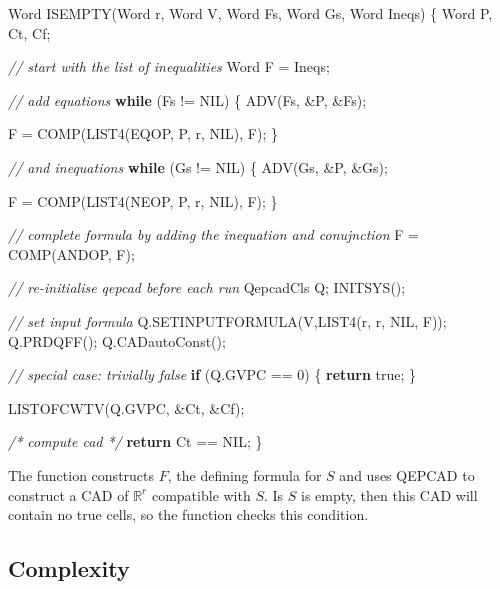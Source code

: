 \documentclass[
]{book}
\newenvironment{Shaded}{\begin{snugshade}}{\end{snugshade}}
\newcommand{\CommentTok}[1]{\textcolor[rgb]{0.56,0.35,0.01}{\textit{#1}}}
\newcommand{\ControlFlowTok}[1]{\textcolor[rgb]{0.13,0.29,0.53}{\textbf{#1}}}
\newcommand{\DecValTok}[1]{\textcolor[rgb]{0.00,0.00,0.81}{#1}}
\newcommand{\NormalTok}[1]{#1}
\theoremstyle{definition}
\theoremstyle{definition}
\theoremstyle{definition}
\theoremstyle{definition}
\theoremstyle{remark}
\begin{document}
\begin{Shaded}
\begin{Highlighting}[numbers=left,,]
\NormalTok{Word ISEMPTY(Word r, Word V, Word Fs, Word Gs, Word Ineqs)}
\NormalTok{\{}
\NormalTok{    Word P, Ct, Cf;}

    \CommentTok{// start with the list of inequalities}
\NormalTok{    Word F = Ineqs;}

    \CommentTok{// add equations}
    \ControlFlowTok{while}\NormalTok{ (Fs != NIL) \{}
\NormalTok{        ADV(Fs, \&P, \&Fs);}

\NormalTok{        F = COMP(LIST4(EQOP, P, r, NIL), F);}
\NormalTok{    \}}

    \CommentTok{// and inequations}
    \ControlFlowTok{while}\NormalTok{ (Gs != NIL) \{}
\NormalTok{        ADV(Gs, \&P, \&Gs);}

\NormalTok{        F = COMP(LIST4(NEOP, P, r, NIL), F);}
\NormalTok{    \}}

    \CommentTok{// complete formula by adding the inequation and conujnction}
\NormalTok{    F = COMP(ANDOP, F);}

    \CommentTok{// re{-}initialise qepcad before each run}
\NormalTok{    QepcadCls Q;}
\NormalTok{    INITSYS();}

    \CommentTok{// set input formula}
\NormalTok{    Q.SETINPUTFORMULA(V,LIST4(r, r, NIL, F));}
\NormalTok{    Q.PRDQFF();}
\NormalTok{    Q.CADautoConst();}

    \CommentTok{// special case: trivially false}
    \ControlFlowTok{if}\NormalTok{ (Q.GVPC == }\DecValTok{0}\NormalTok{) \{}
        \ControlFlowTok{return}\NormalTok{ true;}
\NormalTok{    \}}

\NormalTok{    LISTOFCWTV(Q.GVPC, \&Ct, \&Cf);}

    \CommentTok{/* compute cad */}
    \ControlFlowTok{return}\NormalTok{ Ct == NIL;}
\NormalTok{\}}
\end{Highlighting}
\end{Shaded}

The function constructs \(F\), the defining formula for \(S\) and uses QEPCAD to construct a CAD of \(\mathbb{R}^r\) compatible with \(S\). Is \(S\) is empty, then this CAD will contain no true cells, so the function checks this condition.

\hypertarget{complexity}{%
\subsection{Complexity}\label{complexity}}
\end{document}
